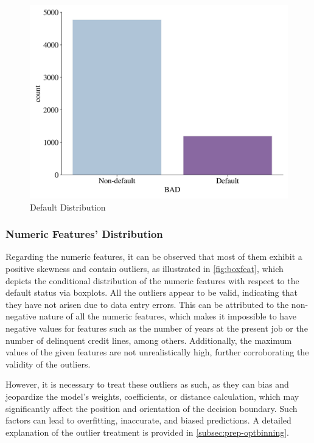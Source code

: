 \begin{figure}[H]
\centering
\caption{Default Distribution}
\label{fig:defaultdist}
\includegraphics[width=130mm]{Figures/Default_Distribution.jpg}\vspace{-1em}

\vspace{-1em}
\end{figure}

\subsubsection{Numeric Features' Distribution}
\label{subsubsec:numdist}

Regarding the numeric features, it can be observed that most of them exhibit a positive skewness and contain outliers, as illustrated in \autoref{fig:boxfeat}, which depicts the conditional distribution of the numeric features with respect to the default status via boxplots.
All the outliers appear to be valid, indicating that they have not arisen due to data entry errors.
This can be attributed to the non-negative nature of all the numeric features, which makes it impossible to have negative values for features such as the number of years at the present job or the number of delinquent credit lines, among others.
Additionally, the maximum values of the given features are not unrealistically high, further corroborating the validity of the outliers.


However, it is necessary to treat these outliers as such, as they can bias and jeopardize the model's weights, coefficients, or distance calculation, which may significantly affect the position and orientation of the decision boundary.
Such factors can lead to overfitting, inaccurate, and biased predictions.
A detailed explanation of the outlier treatment is provided in \autoref{subsec:prep-optbinning}.


